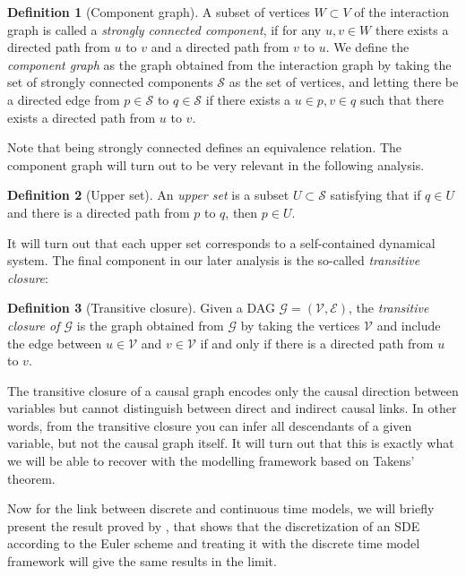 \documentclass[11pt, a4paper]{memoir}
\theoremstyle{plain}
\theoremstyle{definition}
\newtheorem{defn}{Definition}
\begin{document}
\begin{defn}[Component graph]
A subset of vertices $W\subset V$ of the interaction graph is called a \emph{strongly connected component}, if for any $u,v\in W$ there exists a directed path from $u$ to $v$ and a directed path from $v$ to $u$. We define the \emph{component graph} as the graph obtained from the interaction graph by taking the set of strongly connected components $\mathcal{S}$ as the set of vertices, and letting there be a directed edge from $p\in \mathcal{S}$ to $q\in \mathcal{S}$ if there exists a $u\in p,v\in q$ such that there exists a directed path from $u$ to $v$.
\end{defn}
Note that being strongly connected defines an equivalence relation. The component graph will turn out to be very relevant in the following analysis.
\begin{defn}[Upper set]
An \emph{upper set} is a subset $U\subset \mathcal{S}$ satisfying that if $q\in U$ and there is a directed path from $p$ to $q$, then $p\in U$.
\end{defn}
It will turn out that each upper set corresponds to a self-contained dynamical system. The final component in our later analysis is the so-called \textit{transitive closure}:
\begin{defn}[Transitive closure]
Given a DAG $\mathcal{G}=(\mathcal{V},\mathcal{E})$, the \emph{transitive  closure of $\mathcal{G}$} is the graph obtained from $\mathcal{G}$ by taking the vertices $\mathcal{V}$ and include the edge between $u\in \mathcal{V}$ and $v\in \mathcal{V}$ if and only if there is a directed path from $u$ to $v$.
\end{defn}
The transitive closure of a causal graph encodes only the causal direction between variables but cannot distinguish between direct and indirect causal links. In other words, from the transitive closure you can infer all descendants of a given variable, but not the causal graph itself. It will turn out that this is exactly what we will be able to recover with the modelling framework based on Takens' theorem.

Now for the link between discrete and continuous time models, we will briefly present the result proved by \cite{sokol2014}, that shows that the discretization of an SDE according to the Euler scheme and treating it with the discrete time model framework will give the same results in the limit.
\end{document}

